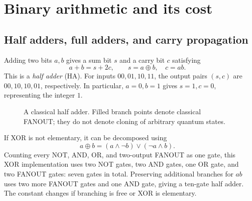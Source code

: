 \documentclass[11pt,oneside,openany]{book}
\theoremstyle{definition}
\begin{document}
\section{Binary arithmetic and its cost}

\subsection{Half adders, full adders, and carry propagation}
Adding two bits $a,b$ gives a sum bit $s$ and a carry bit $c$ satisfying
\begin{equation}
 a+b=s+2c,\qquad s=a\oplus b,\quad c=ab.
\end{equation}
This is a \emph{half adder} (HA). For inputs $00,01,10,11$, the output pairs $(s,c)$ are $00,10,10,01$, respectively. In particular, $a=0,b=1$ gives $s=1,c=0$, representing the integer $1$.
\par
\begin{figure}[htbp]
\centering
{}
\caption{A classical half adder. Filled branch points denote classical FANOUT; they do not denote cloning of arbitrary quantum states.}
\label{fig:halfadder}
\end{figure}
\par
If XOR is not elementary, it can be decomposed using
\begin{equation}
 a\oplus b=(a\land\neg b)\lor(\neg a\land b).
\end{equation}
Counting every NOT, AND, OR, and two-output FANOUT as one gate, this XOR implementation uses two NOT gates, two AND gates, one OR gate, and two FANOUT gates: seven gates in total. Preserving additional branches for $ab$ uses two more FANOUT gates and one AND gate, giving a ten-gate half adder. The constant changes if branching is free or XOR is elementary.
\end{document}
